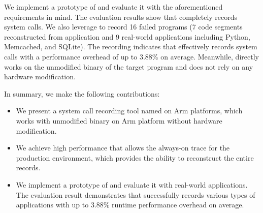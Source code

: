 We implement a prototype of \TheName{} and evaluate it with the 
aforementioned requirements in mind. The evaluation results show that
\TheName{} completely records system calls. 
We also leverage \TheName to record 16 failed programs (7 code segments 
reconstructed from application and 9 real-world applications including Python, Memcached, and SQLite). The recording indicates that \TheName effectively records system calls
 with a performance overhead of
up to 3.88\% on average. Meanwhile, \TheName{} directly works on the unmodified binary of the target 
program and does not rely on any hardware modification.



In summary, we make the following contributions:
\begin{itemize}
    \item We present a system call recording tool named \TheName{} on Arm platforms, which 
     works with
    unmodified binary on Arm platform without hardware modification.
    \item We achieve high performance that allows the
    always-on trace for the production environment, which provides \TheName{} the ability
    to reconstruct the entire records.
    \item We implement a prototype of \TheName{} and evaluate it with
    real-world applications.
    The evaluation result demonstrates that \TheName{} successfully records
    various types of applications with up to 3.88\% runtime
    performance overhead on average.
  \end{itemize}
  